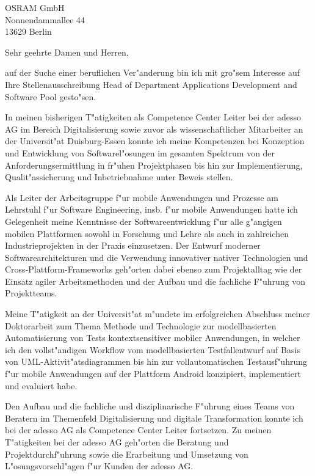 \documentclass[11pt,a4paper]{dinbrief}
\date{\today}
\begin{document}
 
\begin{letter}  
{%
	OSRAM GmbH\\
	Nonnendammallee 44\\
	13629 Berlin 
}
\subject{\bf Bewerbung Head of Department Applications Development and Software Pool}
\opening{Sehr geehrte Damen und Herren,}
auf der Suche einer beruflichen Ver"anderung bin ich mit gro"sem Interesse auf Ihre Stellenausschreibung Head of Department Applications Development and Software Pool gesto"sen. 

In meinen bisherigen T"atigkeiten als Competence Center Leiter bei der adesso AG im Bereich Digitalisierung sowie zuvor als wissenschaftlicher Mitarbeiter an der Universit"at Duisburg-Essen konnte ich meine Kompetenzen bei Konzeption und Entwicklung von Softwarel"osungen im gesamten Spektrum von der Anforderungsermittlung in fr"uhen Projektphasen bis hin zur Implementierung, Qualit"assicherung und Inbetriebnahme unter Beweis stellen.

Als Leiter der Arbeitsgruppe f"ur mobile Anwendungen und Prozesse am Lehrstuhl f"ur Software Engineering, insb. f"ur mobile Anwendungen hatte ich Gelegenheit meine Kenntnisse der Softwareentwicklung f"ur alle g"angigen mobilen Plattformen sowohl in Forschung und Lehre als auch in zahlreichen Industrieprojekten in der Praxis einzusetzen. Der Entwurf moderner Softwarearchitekturen und die Verwendung innovativer nativer Technologien und Cross-Plattform-Frameworks geh"orten dabei ebenso zum Projektalltag wie der Einsatz agiler Arbeitsmethoden und der Aufbau und die fachliche  F"uhrung von Projektteams.

Meine T"atigkeit an der Universit"at m"undete im erfolgreichen Abschluss meiner Doktor\-arbeit zum Thema Methode und Technologie zur modellbasierten Automatisierung von Tests kontextsensitiver mobiler Anwendungen, in welcher ich den vollst"andigen Workflow vom modellbasierten Testfallentwurf auf Basis von UML-Aktivit"atsdiagrammen bis hin zur vollautomatischen Testausf"uhrung f"ur mobile Anwendungen auf der Plattform Android konzipiert, implementiert und evaluiert habe.

\clearpage
Den Aufbau und die fachliche und disziplinarische F"uhrung eines Teams von Beratern im Themenfeld Digitalisierung und digitale Transformation  konnte ich bei der adesso AG als Competence Center Leiter fortsetzen. Zu meinen T"atigkeiten bei der adesso AG geh"orten die Beratung und Projektdurchf"uhrung sowie die Erarbeitung und Umsetzung von L"osungsvorschl"agen f"ur Kunden der adesso AG. 


\end{letter}
\end{document}
